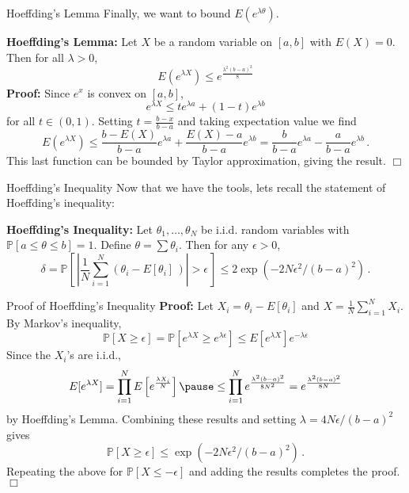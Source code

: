 \documentclass[10pt, table, dvipsnames,handout]{beamer}
\newcommand{\bP}{\ensuremath{\mathbb{P}}}
\begin{document}
\begin{frame}[fragile]{Hoeffding's Lemma}
Finally, we want to bound $E(e^{\lambda \theta})$.\newline

\textbf{Hoeffding's Lemma:} Let $X$ be a random variable on $[a,b]$ with $E(X)=0$. Then for all $\lambda>0$, 
$$
E(e^{\lambda X}) \leq e^{\frac{\lambda^2(b-a)^2 }8}
$$\pause
\textbf{Proof:} Since $e^x$ is convex on $[a,b]$, $$e^{\lambda X} \leq te^{\lambda a} + (1-t)e^{\lambda b} $$
for all $t\in(0,1)$. \pause Setting $t = \frac{b-x}{b-a}$ and taking expectation value we find
$$
E(e^{\lambda X})  \leq \frac{b-E(X)}{b-a}e^{\lambda a} + \frac{E(X)-a}{b-a}e^{\lambda b} = \frac{b}{b-a}e^{\lambda a} - \frac{a}{b-a}e^{\lambda b}\,.
$$
This last function can be bounded by Taylor approximation, giving the result. $\Box$

\end{frame}







\begin{frame}[fragile]{Hoeffding's Inequality}
Now that we have the tools, lets recall the statement of Hoeffding's inequality:

\textbf{Hoeffding's Inequality:} Let $\theta_1,\ldots, \theta_N$ be i.i.d. random variables with $\bP[a\leq \theta\leq b] = 1$. Define $\theta = \sum \theta_i$. Then for any $\epsilon>0$, 
$$
\delta = \bP\left[\, \left|\frac{1}{N} \sum_{i=1}^N(\theta_i - E[\theta_i]\,)\right|>\epsilon  \,\right]\leq 2\exp\left(-2N\epsilon^2/(b-a)^2\right)\,.
$$
\end{frame}




\begin{frame}[fragile]{Proof of Hoeffding's Inequality}
\textbf{Proof:} Let $X_i = \theta_i - E[\theta_i]$ and $X = \frac1N\sum_{i=1}^N X_i$. \pause By Markov's inequality,
$$
\bP[X\geq \epsilon] = \bP\left[ e^{\lambda X} \geq e^{\lambda \epsilon} \right] \leq E[e^{\lambda X}]e^{-\lambda \epsilon }
$$\pause
Since the $X_i$'s are i.i.d., 
$$
E[e^{\lambda X}] = \prod_{i=1}^N E\left[e^{\frac{\lambda X_i}N}\right]\pause
\leq
\prod_{i=1}^N e^{\frac{\lambda^2(b-a)^2 }{8N^2}} = e^{\frac{\lambda^2(b-a)^2 }{8N}}
$$
by Hoeffding's Lemma. \pause Combining these results and setting $\lambda = 4N\epsilon/(b-a)^2$ gives
$$
\bP[X\geq \epsilon] \leq  \exp\left(-2N\epsilon^2/(b-a)^2\right)\,.
$$
Repeating the above for $\bP[X\leq -\epsilon] $ and adding the results completes the proof. $\Box$
\end{frame}
\end{document}
